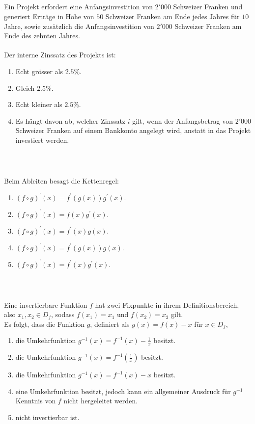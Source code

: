 \subsection*{}
Ein Projekt erfordert eine Anfangsinvestition von $2'000$ Schweizer Franken und generiert Erträge in Höhe von $50$ Schweizer Franken am Ende jedes Jahres für $10$ Jahre, sowie zusätzlich die Anfangsinvestition von $2'000$ Schweizer Franken am Ende des zehnten Jahres.\\
\\
Der interne Zinssatz des Projekts ist:
\renewcommand{\labelenumi}{(\alph{enumi})}
\begin{enumerate}
	\item 
	Echt grösser als $2.5 \%$.
	\item 
	Gleich $2.5 \%$.
	\item
	Echt kleiner als $2.5 \%$.
	\item
	Es hängt davon ab, welcher Zinssatz $i$ gilt, wenn der Anfangsbetrag von $2'000$ Schweizer Franken auf einem Bankkonto angelegt wird, anstatt in das Projekt investiert werden.
\end{enumerate}
\ \\
\subsection*{}
Beim Ableiten besagt die Kettenregel:
\renewcommand{\labelenumi}{(\alph{enumi})}
\begin{enumerate}
	\item 
	$ (f \circ g)^\prime(x) = f^\prime(g(x)) g^\prime(x)$.
	\item 
	$ (f \circ g)^\prime(x) = f(x) g^\prime(x)$.
	\item
	$ (f \circ g)^\prime(x) = f^\prime(x) g(x)$.
	\item
	$ (f \circ g)^\prime(x) = f^\prime(g(x)) g(x)$.
	\item
	$ (f \circ g)^\prime(x) = f^\prime(x) g^\prime(x)$.
\end{enumerate}
\ \\
\subsection*{}
Eine invertierbare Funktion $f$ hat zwei Fixpunkte in ihrem Definitionsbereich, also $x_1,x_2 \in D_f$, sodass $f(x_1) = x_1$ und $f(x_2) = x_2$ gilt.\\
Es folgt, dass die Funktion $g$, definiert als $g(x) = f(x) - x$ für $x \in D_f$,
\renewcommand{\labelenumi}{(\alph{enumi})}
\begin{enumerate}
\item 
die Umkehrfunktion $g^{-1}(x) = f^{-1}(x) - \frac{1}{x} $ besitzt.
\item
die Umkehrfunktion $g^{-1}(x) = f^{-1}\left(\frac{1}{x}\right) $ besitzt.
\item
die Umkehrfunktion $g^{-1}(x) = f^{-1}(x) - x $ besitzt.
\item
eine Umkehrfunktion besitzt, jedoch kann ein allgemeiner Ausdruck für $g^{-1} $ Kenntnis von $f$ nicht hergeleitet werden.
\item
nicht invertierbar ist.
\end{enumerate}
\ \\

